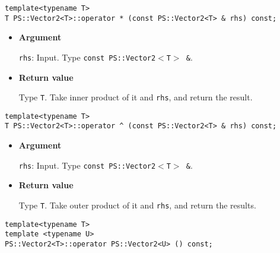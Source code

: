 
\begin{screen}
\begin{verbatim}
template<typename T>
T PS::Vector2<T>::operator * (const PS::Vector2<T> & rhs) const;
\end{verbatim}
\end{screen}

\begin{itemize}

\item{{\bf Argument}}

\texttt{rhs}: Input. Type \texttt{const PS::Vector2$<$T$>$ \&}.

\item{{\bf Return value}}

Type \texttt{T}. Take inner product of it and \texttt{rhs}, and return the result.

\end{itemize}

\begin{screen}
\begin{verbatim}
template<typename T>
T PS::Vector2<T>::operator ^ (const PS::Vector2<T> & rhs) const;
\end{verbatim}
\end{screen}

\begin{itemize}

\item{{\bf Argument}}

\texttt{rhs}: Input. Type \texttt{const PS::Vector2$<$T$>$ \&}.

\item{{\bf Return value}}

Type \texttt{T}. Take outer product of it and \texttt{rhs}, and return the results.

\end{itemize}


\begin{screen}
\begin{verbatim}
template<typename T>
template <typename U>
PS::Vector2<T>::operator PS::Vector2<U> () const;
\end{verbatim}
\end{screen}

